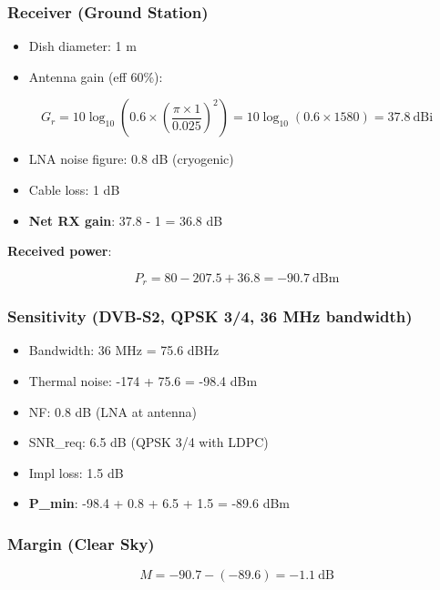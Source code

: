 \subsubsection{Receiver (Ground Station)}\label{receiver-ground-station}

\begin{itemize}
\tightlist
\item
  Dish diameter: 1 m
\item
  Antenna gain (eff 60\%):
\end{itemize}

\[
G_r = 10\log_{10}\left(0.6 \times \left(\frac{\pi \times 1}{0.025}\right)^2\right) = 10\log_{10}(0.6 \times 1580) = 37.8\ \text{dBi}
\]

\begin{itemize}
\tightlist
\item
  LNA noise figure: 0.8 dB (cryogenic)
\item
  Cable loss: 1 dB
\item
  \textbf{Net RX gain}: 37.8 - 1 = 36.8 dB
\end{itemize}

\textbf{Received power}:

\[
P_r = 80 - 207.5 + 36.8 = -90.7\ \text{dBm}
\]

\subsubsection{Sensitivity (DVB-S2, QPSK 3/4, 36 MHz
bandwidth)}\label{sensitivity-dvb-s2-qpsk-34-36-mhz-bandwidth}

\begin{itemize}
\tightlist
\item
  Bandwidth: 36 MHz = 75.6 dBHz
\item
  Thermal noise: -174 + 75.6 = -98.4 dBm
\item
  NF: 0.8 dB (LNA at antenna)
\item
  SNR\_req: 6.5 dB (QPSK 3/4 with LDPC)
\item
  Impl loss: 1.5 dB
\item
  \textbf{P\_min}: -98.4 + 0.8 + 6.5 + 1.5 = -89.6 dBm
\end{itemize}

\subsubsection{Margin (Clear Sky)}\label{margin-clear-sky}

\[
M = -90.7 - (-89.6) = -1.1\ \text{dB}
\]

